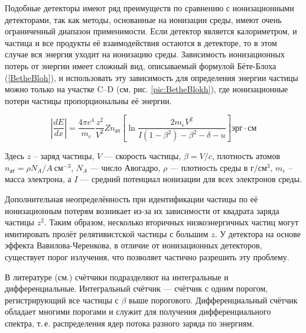 \documentclass[12pt,a4paper]{report} %
\begin{document}
Подобные детекторы имеют ряд преимуществ по сравнению с ионизационными детекторами, так как методы, основанные на ионизации среды, имеют очень ограниченный диапазон применимости. Если детектор является калориметром, и частица и все продукты её взаимодействия остаются в детекторе, то в этом случае вся энергия уходит на ионизацию среды. Зависимость ионизационных потерь от энергии имеет сложный вид, описываемый формулой Бёте-Блоха (\ref{BetheBloh}), и использовать эту зависимость для определения энергии частицы можно только на участке C--D (см. рис. \ref{pic:BetheBlokh}), где ионизационные потери частицы пропорциональны её энергии.

\begin{equation}\label{BetheBloh}
\left| \frac{dE}{dx}\right| = \frac{4\pi e^4}{m_e}\frac{z^2}{V^2}Zn_{ат}
\left[
	\ln \frac{2m_eV^2}{I(1-\beta^2)-\beta^2-\delta-u} 
\right] эрг\cdot см
\end{equation}

Здесь $z$ -- заряд частицы, $V$ --- скорость частицы, $\beta = V / c$, плотность атомов $n_{ат}=\rho N_A/A~см^{-3}$, $N_A$ --- число Авогадро, $\rho$ --- плотность среды в $г/см^3$, $m_e$ -- масса электрона, а $I$ --- средний потенциал ионизации для всех электронов среды. 

Дополнительная неопределённость при идентификации частицы по её ионизационным потерям возникает из-за их зависимости от квадрата заряда частицы $z^2$. Таким образом, несколько вторичных низкоэнергичных частиц могут имитировать пролёт релятивистской частицы с большим $z$. У детектора на основе эффекта Вавилова-Черенкова, в отличие от ионизационных детекторов, существует порог излучения, что позволяет частично разрешить эту проблему. 

В литературе (см.\cite{Ginzburg}) счётчики подразделяют на интегральные и дифференциальные. Интегральный счётчик --- счётчик с одним порогом, регистрирующий все частицы с $\beta$ выше порогового. Дифференциальный счётчик обладает многими порогами и служит для получения дифференциального спектра, т.\,е. распределения ядер потока разного заряда по энергиям.
\end{document}
